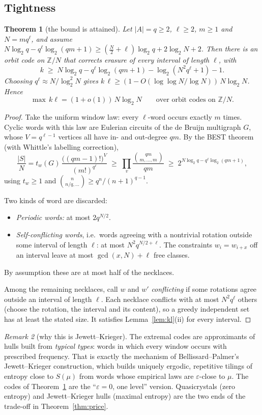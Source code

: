 \documentclass[11pt]{article}
\newtheorem{theorem}{Theorem}[section]
\theoremstyle{definition}
\theoremstyle{remark}
\newtheorem{remark}[theorem]{Remark}
\newcommand{\Z}{\mathbb Z}
\begin{document}
\subsection{Tightness}

\begin{theorem}[the bound is attained]\label{thm:tight}
Let $|A|=q\ge2$, $\ell\ge2$, $m\ge1$ and $N=mq^\ell$, and assume $N\log_2q-q^\ell\log_2(qm+1)\ge(\tfrac N2+\ell)\log_2q+2\log_2N+2$. Then there is an orbit code on $\Z/N$ that corrects erasure of \emph{every} interval of length $\ell$, with
\[k\;\ge\;N\log_2q-q^\ell\log_2(qm+1)-\log_2(N^2q^\ell+1)-1.\]
Choosing $q^\ell\approx N/\log_2^2N$ gives $k\,\ell\ge(1-O(\log\log N/\log N))\,N\log_2N$. Hence
\[\max\,k\ell=(1+o(1))\,N\log_2N\qquad\text{over orbit codes on }\Z/N.\]
\end{theorem}

\begin{proof}
Take the uniform window law: every $\ell$-word occurs exactly $m$ times. Cyclic words with this law are Eulerian circuits of the de Bruijn multigraph $G$, whose $V=q^{\ell-1}$ vertices all have in- and out-degree $qm$. By the BEST theorem (with Whittle's labelling correction),
\[\frac{|S|}N=t_w(G)\,\frac{\big((qm-1)!\big)^{V}}{(m!)^{q^\ell}}\;\ge\;\prod_v\frac{\binom{qm}{m,\dots,m}}{qm}\;\ge\;2^{N\log_2q-q^\ell\log_2(qm+1)},\]
using $t_w\ge1$ and $\binom{n}{n/q,\dots}\ge q^n/(n+1)^{q-1}$.

Two kinds of word are discarded:
\begin{itemize}
\item \emph{Periodic words:} at most $2q^{N/2}$.
\item \emph{Self-conflicting words}, i.e.\ words agreeing with a nontrivial rotation outside some interval of length $\ell$: at most $N^2q^{N/2+\ell}$. The constraints $w_i=w_{i+x}$ off an interval leave at most $\gcd(x,N)+\ell$ free classes.
\end{itemize}
By assumption these are at most half of the necklaces.

Among the remaining necklaces, call $w$ and $w'$ \emph{conflicting} if some rotations agree outside an interval of length $\ell$. Each necklace conflicts with at most $N^2q^\ell$ others (choose the rotation, the interval and its content), so a greedy independent set has at least the stated size. It satisfies Lemma~\ref{lem:kl}(ii) for every interval.
\end{proof}

\begin{remark}[why this is Jewett--Krieger]
The extremal codes are approximants of hulls built from \emph{typical types}: words in which every window occurs with prescribed frequency. That is exactly the mechanism of Bellissard--Palmer's Jewett--Krieger construction, which builds uniquely ergodic, repetitive tilings of entropy close to $S(\mu)$ from words whose empirical laws are $\varepsilon$-close to $\mu$. The codes of Theorem~\ref{thm:tight} are the ``$\varepsilon=0$, one level'' version. Quasicrystals (zero entropy) and Jewett--Krieger hulls (maximal entropy) are the two ends of the trade-off in Theorem~\ref{thm:price}.
\end{remark}
\end{document}
